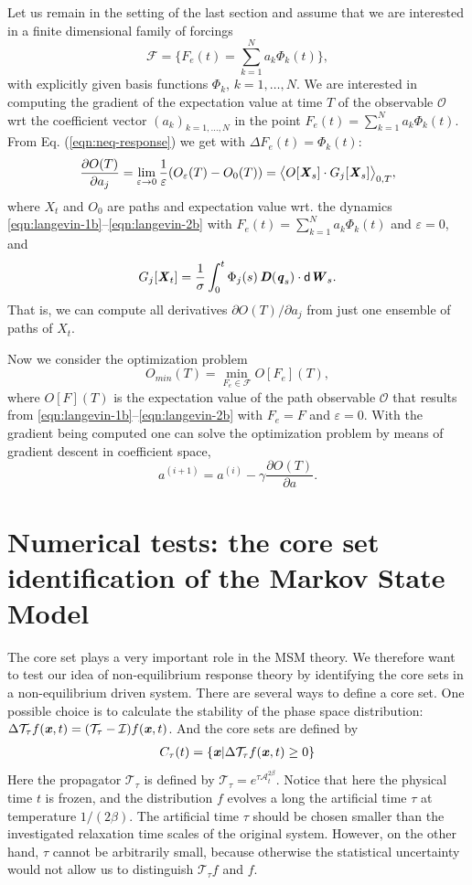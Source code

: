 \documentclass[aip,jcp,a4paper,reprint,onecolumn]{revtex4-1}
\newcommand{\vect}[1]{\textbf{\textit{#1}}}
\newcommand{\dd}{\textsf{d}}
\newcommand{\eps}{\varepsilon}
\newcommand{\mt}{\mathcal T}
\newcommand{\mi}{\mathcal I}
\newcommand{\fwg}{{\mathcal A}}
\begin{document}
Let us remain in the setting of the last section and assume that we are interested in a finite dimensional family of forcings
\[
\mathcal{F}=\{F_e(t)=\sum_{k=1}^N a_k \Phi_k(t)\},
\]
with explicitly given basis functions $\Phi_k$, $k=1,\ldots,N$.
We are interested in computing the gradient of the expectation value at time $T$ of the observable $\mathcal{O}$ wrt the coefficient vector $(a_k)_{k=1,\ldots,N}$ in the point $F_e(t)=\sum_{k=1}^N a_k \Phi_k(t)$. From Eq. (\ref{eqn:neq-response}) we get with $\Delta F_e(t)=\Phi_k(t)$:
\[
\frac{\partial O(T)}{\partial a_j} = \lim_{\eps\to 0}\frac{1}{\eps}( O_\eps(T) -
  O_0(T))=\big\langle O[\vect X_s]\cdot G_j[\vect X_s]\big\rangle_{0,T},
\]
where $X_t$ and $O_0$ are paths and expectation value wrt. the dynamics \eqref{eqn:langevin-1b}--\eqref{eqn:langevin-2b} with $F_e(t)=\sum_{k=1}^N a_k \Phi_k(t)$ and $\eps=0$, and
\[
G_j[\vect X_t]
  = \frac{1}\sigma\int_0^t
  \Phi_j(s)\,\vect D(\vect q_s)\cdot\dd\vect W_s. 
\]
That is, we can compute all derivatives $\partial O(T)/\partial a_j$ from just one ensemble of paths of $X_t$. 

Now we consider the optimization problem
\[
O_{min}(T) = \min_{F_e\in \mathcal{F}} O[F_e](T),
\]
where $O[F](T)$ is the expectation value of the path observable $\mathcal{O}$ that results from \eqref{eqn:langevin-1b}--\eqref{eqn:langevin-2b} with $F_e=F$ and $\eps=0$.
With the gradient being computed one can solve the optimization problem by means of gradient descent in coefficient space,
\[
a^{(i+1)}=a^{(i)} -\gamma \frac{\partial O(T)}{\partial a}.
\]


\section{Numerical tests: the core set identification of  the Markov State Model }

The core set plays a very important role in the MSM theory.  We
therefore want to test our idea of non-equilibrium response theory by
identifying the core sets in a non-equilibrium driven system.
There are several ways to define a core set.
One possible choice  is to calculate the stability of the phase space
distribution: $\Delta \mt_\tau f(\vect x, t) = (\mt_\tau -\mi) f(\vect
x, t)$. And the core sets are defined by
\begin{align}
  C_\tau(t) = \{\vect x\vert \Delta \mt_\tau f(\vect x, t) \geq 0\}
\end{align}
Here the propagator $\mt_\tau$ is defined by $\mt_\tau =
e^{\tau\fwg_t^{2\beta}}$.  Notice that here the physical time $t$ is
frozen, and the distribution $f$ evolves a long the artificial time
$\tau$ at temperature $1/(2\beta)$. The artificial time $\tau$ should
be chosen smaller than the investigated relaxation time scales of the
original system. However, on the other hand, $\tau$ cannot be
arbitrarily small, because otherwise the statistical uncertainty would
not allow us to distinguish $\mt_\tau f$ and $f$.
\end{document}
